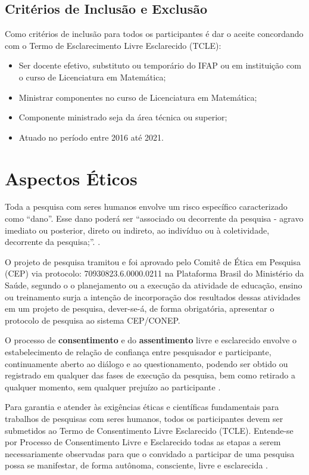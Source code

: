 \subsection{Critérios de Inclusão e Exclusão}
\label{criterios_sujeitos}

Como critérios de inclusão para todos os participantes  é dar o aceite concordando com o Termo de Esclarecimento Livre Esclarecido (TCLE):
\begin{itemize}
    \item Ser docente efetivo, substituto ou temporário do IFAP ou em instituição com o curso de Licenciatura em Matemática;
    \item Ministrar componentes no curso de Licenciatura em Matemática;
    \item Componente ministrado seja da área técnica ou superior;
    \item Atuado no período entre 2016 até 2021.
\end{itemize}




\section{Aspectos Éticos}
\label{aspectos_eticos}

Toda a pesquisa com seres humanos envolve um risco específico caracterizado como “dano”. Esse dano poderá ser “associado ou decorrente da pesquisa - agravo imediato ou posterior, direto ou indireto, ao indivíduo ou à coletividade, decorrente da pesquisa;”. \cite{cns466}.

O projeto de pesquisa tramitou e foi aprovado pelo Comitê de Ética em Pesquisa (CEP) via protocolo: 70930823.6.0000.0211 na Plataforma Brasil do Ministério da Saúde, segundo o  o planejamento ou a execução da atividade de educação, ensino ou treinamento surja a intenção de incorporação dos resultados dessas atividades em um projeto de pesquisa, dever-se-á, de forma obrigatória, apresentar o protocolo de pesquisa ao sistema CEP/CONEP.

O processo de \textbf{consentimento} e do \textbf{assentimento} livre e esclarecido envolve o estabelecimento de relação de confiança entre pesquisador e participante, continuamente aberto ao diálogo e ao questionamento, podendo ser obtido ou registrado em qualquer das fases de execução da pesquisa, bem como retirado a qualquer momento, sem qualquer prejuízo ao participante \cite{cns510}.

Para garantia e atender às exigências éticas e científicas fundamentais para trabalhos de pesquisas com seres humanos, todos os participantes devem ser submetidos ao Termo de Consentimento Livre Esclarecido (TCLE). Entende-se por Processo de Consentimento Livre e Esclarecido todas as etapas a serem necessariamente observadas para que o convidado a participar de uma pesquisa possa se manifestar, de forma autônoma, consciente, livre e esclarecida \cite{cns466}.




